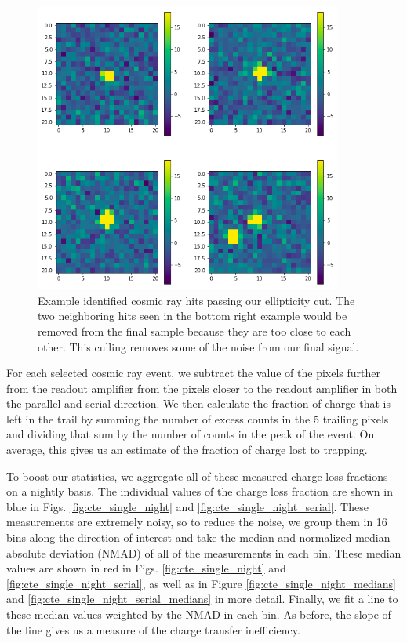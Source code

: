 \begin{figure}
    \centering
    \includegraphics[width=0.9\textwidth]{figures/cte/example_hits.png}
    \caption{Example identified cosmic ray hits passing our ellipticity cut. The two neighboring hits seen in the bottom right example would be removed from the final sample because they are too close to each other. This culling removes some of the noise from our final signal.}
    \label{fig:example_hits}
\end{figure}

For each selected cosmic ray event, we subtract the value of the pixels further from the readout amplifier from the pixels closer to the readout amplifier in both the parallel and serial direction. We then calculate the fraction of charge that is left in the trail by summing the number of excess counts in the 5 trailing pixels and dividing that sum by the number of counts in the peak of the event. On average, this gives us an estimate of the fraction of charge lost to trapping. 
    
To boost our statistics, we aggregate all of these measured charge loss fractions on a nightly basis. The individual values of the charge loss fraction are shown in blue in Figs. \ref{fig:cte_single_night} and \ref{fig:cte_single_night_serial}. These measurements are extremely noisy, so to reduce the noise, we group them in 16 bins along the direction of interest and take the median and normalized median absolute deviation (NMAD) of all of the measurements in each bin. These median values are shown in red in Figs. \ref{fig:cte_single_night} and \ref{fig:cte_single_night_serial}, as well as in Figure \ref{fig:cte_single_night_medians} and \ref{fig:cte_single_night_serial_medians} in more detail. Finally, we fit a line to these median values weighted by the NMAD in each bin. As before, the slope of the line gives us a measure of the charge transfer inefficiency.

